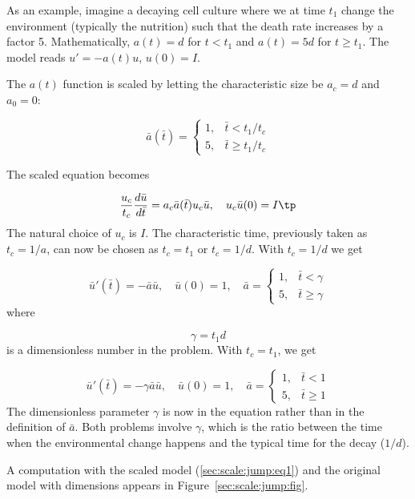 \documentclass[graybox,envcountchap,sectrefs,final]{svmonodo}
\begin{document}
As an example, imagine a decaying cell culture where we at time $t_1$
change the environment (typically the nutrition)
such that the death rate increases by a factor 5.
Mathematically, $a(t) = d$ for
$t < t_1$ and $a(t)=5d$ for $t\geq t_1$. The model reads $u'=-a(t)u$, $u(0)=I$.

The $a(t)$ function is scaled by letting the characteristic size be
$a_c=d$ and $a_0=0$:

\[ \bar a (\bar t) = \left\lbrace\begin{array}{ll}
1, & \bar t < t_1/t_c\\ 
5, & \bar t \geq t_1/t_c
\end{array}\right.
\]


The scaled equation becomes

\[ \frac{u_c}{t_c}\frac{d\bar u}{d\bar t} = a_c\bar a(\bar t) u_c\bar u,\quad
u_c\bar u(0) = I\tp\]
The natural choice of $u_c$ is $I$.
The characteristic time, previously taken as $t_c=1/a$, can now be
chosen as $t_c=t_1$ or $t_c=1/d$.
With $t_c=1/d$ we get

\begin{equation}
\bar u'(\bar t)=-\bar a\bar u,\quad \bar u(0)=1,\quad
\bar a = \left\lbrace\begin{array}{ll}
1, & \bar t < \gamma\\ 
5, & \bar t \geq \gamma
\end{array}\right.
\label{sec:scale:jump:eq1}
\end{equation}
where

\[ \gamma = t_1 d\]
is a dimensionless number in the problem. With $t_c=t_1$, we get

\[ \bar u'(\bar t)=-\gamma\bar a\bar u,\quad \bar u(0)=1,\quad
\bar a = \left\lbrace\begin{array}{ll}
1, & \bar t < 1\\ 
5, & \bar t \geq 1
\end{array}\right.\]
The dimensionless parameter $\gamma$ is now in the equation rather than in
the definition of $\bar a$. Both problems involve $\gamma$, which
is the ratio between the time when the environmental change happens
and the typical time for the decay ($1/d$).

A computation with the scaled model (\ref{sec:scale:jump:eq1})
and the original model with dimensions appears in
Figure~\ref{sec:scale:jump:fig}.
\end{document}
